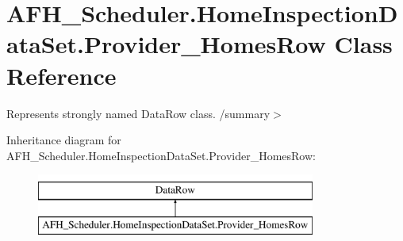 \section{A\+F\+H\+\_\+\+Scheduler.\+Home\+Inspection\+Data\+Set.\+Provider\+\_\+\+Homes\+Row Class Reference}
\label{class_a_f_h___scheduler_1_1_home_inspection_data_set_1_1_provider___homes_row}


Represents strongly named Data\+Row class. /summary$>$  


Inheritance diagram for A\+F\+H\+\_\+\+Scheduler.\+Home\+Inspection\+Data\+Set.\+Provider\+\_\+\+Homes\+Row\+:\begin{figure}[H]
\begin{center}
\leavevmode
\includegraphics[height=2.000000cm]{class_a_f_h___scheduler_1_1_home_inspection_data_set_1_1_provider___homes_row}
\end{center}
\end{figure}
